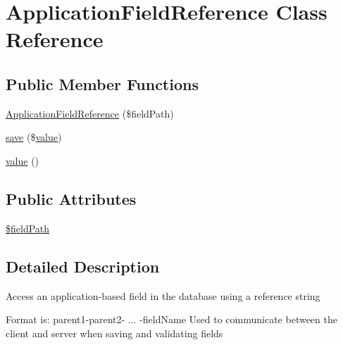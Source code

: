 \hypertarget{class_application_field_reference}{\section{Application\-Field\-Reference Class Reference}
\label{class_application_field_reference}
}
\subsection*{Public Member Functions}
\begin{DoxyCompactItemize}
\item 
\hyperlink{class_application_field_reference_ac9c0f1ab37d8faab49c75f48f0d39579}{Application\-Field\-Reference} (\$field\-Path)
\item 
\hyperlink{class_application_field_reference_a580e72f097764c26458eccb8fc0f582d}{save} (\$\hyperlink{class_application_field_reference_aa8e8e8cef22afafaae4eab3a80aa3da7}{value})
\item 
\hyperlink{class_application_field_reference_aa8e8e8cef22afafaae4eab3a80aa3da7}{value} ()
\end{DoxyCompactItemize}
\subsection*{Public Attributes}
\begin{DoxyCompactItemize}
\item 
\hyperlink{class_application_field_reference_a9c7750a775ac64b70cd39f20ca3bb096}{\$field\-Path}
\end{DoxyCompactItemize}


\subsection{Detailed Description}
Access an application-\/based field in the database using a reference string

Format is\-: parent1-\/parent2-\/ ... -\/field\-Name Used to communicate between the client and server when saving and validating fields 

